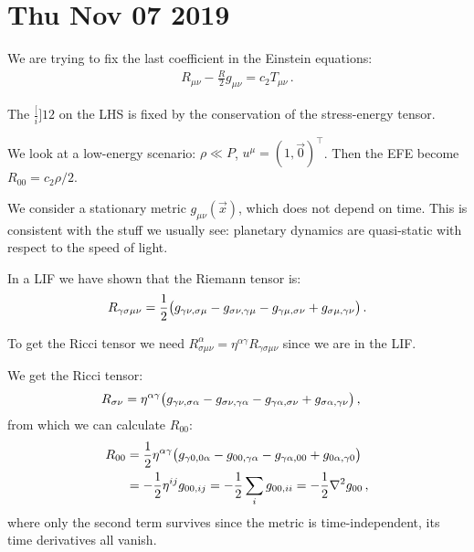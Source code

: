 \documentclass[main.tex]{subfiles}
\begin{document}
\section*{Thu Nov 07 2019}

We are trying to fix the last coefficient in the Einstein equations: 
%
\begin{align}
  R_{\mu \nu } - \frac{R}{2} g_{ \mu \nu } = c_2 T_{\mu \nu }
\,.
\end{align}

The \(\frac[i]{1}{2} \) on the LHS is fixed by the conservation of the stress-energy tensor.

We look at a low-energy scenario: \(\rho \ll P\), \(u^{\mu } = (1, \vec{0})^\top\). Then the EFE become \(R_{00} = c_2 \rho /2\).

We consider a stationary metric \(g_{\mu \nu } (\vec{x})\), which does not depend on time. This is consistent with the stuff we usually see: planetary dynamics are quasi-static with respect to the speed of light.

In a LIF we have shown that the Riemann tensor is:
%
\begin{align}
  R_{\gamma \sigma \mu \nu } = \frac{1}{2} \qty(g_{\gamma \nu , \sigma \mu } - g_{\sigma \nu , \gamma \mu } - g_{\gamma \mu , \sigma \nu } + g_{\sigma \mu , \gamma \nu })
\,.
\end{align}

To get the Ricci tensor we need \(R^{\alpha }_{\sigma \mu \nu } = \eta^{\alpha \gamma }R_{\gamma \sigma \mu \nu }\) since we are in the LIF.

We get the Ricci tensor:
%
\begin{align}
  R_{\sigma \nu } &=  \eta^{\alpha \gamma } \qty(g_{\gamma \nu , \sigma \alpha } - g_{\sigma \nu , \gamma \alpha } - g_{\gamma \alpha , \sigma \nu } + g_{\sigma \alpha , \gamma \nu })
\,,
\end{align}
%
from which we can calculate \(R_{00}\):
%
\begin{subequations}
\begin{align}
    R_{0 0 } &= \frac{1}{2} \eta^{\alpha \gamma } \qty(g_{\gamma 0 , 0 \alpha } - g_{0 0 , \gamma \alpha } - g_{\gamma \alpha , 0 0 } + g_{0 \alpha , \gamma 0 })  \\
    &= -\frac{1}{2}\eta^{i j }g_{00, ij} 
    = - \frac{1}{2} \sum _{i} g_{00, ii} = -\frac{1}{2} \nabla^2 g_{00}
    \,,
\end{align}
\end{subequations}
%
where only the second term survives since the metric is time-independent, its time derivatives all vanish.
\end{document}
